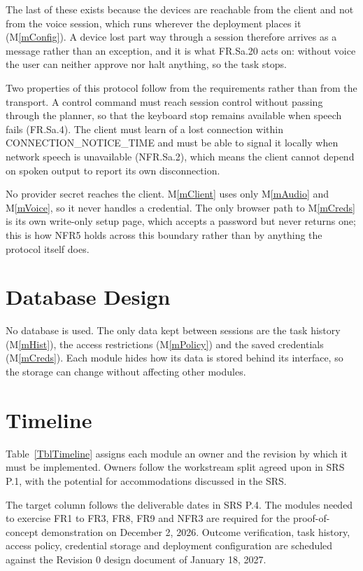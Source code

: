 \documentclass[12pt, titlepage]{article}
\newcommand{\mref}[1]{M\ref{#1}}
\begin{document}
The last of these exists because the devices are reachable from the client and
not from the voice session, which runs wherever the deployment places it
(\mref{mConfig}). A device lost part way through a session therefore arrives as a
message rather than an exception, and it is what FR.Sa.20 acts on: without voice
the user can neither approve nor halt anything, so the task stops.

Two properties of this protocol follow from the requirements rather than from the
transport. A control command must reach session control without passing through
the planner, so that the keyboard stop remains available when speech fails
(FR.Sa.4). The client must learn of a lost connection within
CONNECTION\_NOTICE\_TIME and must be able to signal it locally when network
speech is unavailable (NFR.Sa.2), which means the client cannot depend on spoken
output to report its own disconnection.

No provider secret reaches the client. \mref{mClient} uses only \mref{mAudio}
and \mref{mVoice}, so it never handles a credential. The only browser path to
\mref{mCreds} is its own write-only setup page, which accepts a password but
never returns one; this is how NFR5 holds across this boundary rather than by
anything the protocol itself does.

\section{Database Design}

No database is used. The only data kept between sessions are the task history
(\mref{mHist}), the access restrictions (\mref{mPolicy}) and the saved
credentials (\mref{mCreds}). Each module hides how its data is stored behind its
interface, so the storage can change without affecting other modules.

\section{Timeline} \label{SecTimeline}

Table~\ref{TblTimeline} assigns each module an owner and the revision by which it
must be implemented. Owners follow the workstream split agreed upon in SRS P.1, with
the potential for accommodations discussed in the SRS.

The target column follows the deliverable dates in SRS P.4. The modules needed to
exercise FR1 to FR3, FR8, FR9 and NFR3 are required for the proof-of-concept
demonstration on December 2, 2026. Outcome verification,
task history, access policy, credential storage and deployment configuration are
scheduled against the Revision 0 design document of January 18, 2027.
\end{document}
